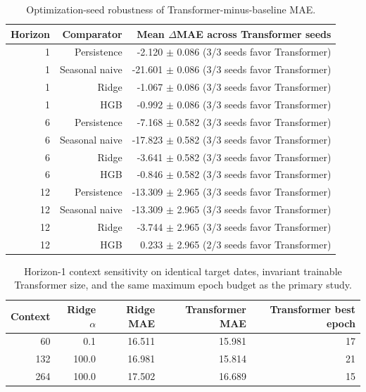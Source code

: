\begin{table}[htbp]
\centering
\small
\begin{tabular}{rrr}
\toprule
Horizon & Comparator & Mean $\Delta$MAE across Transformer seeds \\
\midrule
1 & Persistence & -2.120 $\pm$ 0.086 (3/3 seeds favor Transformer) \\
1 & Seasonal naive & -21.601 $\pm$ 0.086 (3/3 seeds favor Transformer) \\
1 & Ridge & -1.067 $\pm$ 0.086 (3/3 seeds favor Transformer) \\
1 & HGB & -0.992 $\pm$ 0.086 (3/3 seeds favor Transformer) \\
6 & Persistence & -7.168 $\pm$ 0.582 (3/3 seeds favor Transformer) \\
6 & Seasonal naive & -17.823 $\pm$ 0.582 (3/3 seeds favor Transformer) \\
6 & Ridge & -3.641 $\pm$ 0.582 (3/3 seeds favor Transformer) \\
6 & HGB & -0.846 $\pm$ 0.582 (3/3 seeds favor Transformer) \\
12 & Persistence & -13.309 $\pm$ 2.965 (3/3 seeds favor Transformer) \\
12 & Seasonal naive & -13.309 $\pm$ 2.965 (3/3 seeds favor Transformer) \\
12 & Ridge & -3.744 $\pm$ 2.965 (3/3 seeds favor Transformer) \\
12 & HGB & 0.233 $\pm$ 2.965 (2/3 seeds favor Transformer) \\
\bottomrule
\end{tabular}
\caption{Optimization-seed robustness of Transformer-minus-baseline MAE.}
\end{table}

\begin{table}[htbp]
\centering
\small
\begin{tabular}{rrrrr}
\toprule
Context & Ridge $\alpha$ & Ridge MAE & Transformer MAE & Transformer best epoch \\
\midrule
60 & 0.1 & 16.511 & 15.981 & 17 \\
132 & 100.0 & 16.981 & 15.814 & 21 \\
264 & 100.0 & 17.502 & 16.689 & 15 \\
\bottomrule
\end{tabular}
\caption{Horizon-1 context sensitivity on identical target dates, invariant trainable Transformer size, and the same maximum epoch budget as the primary study.}
\end{table}

